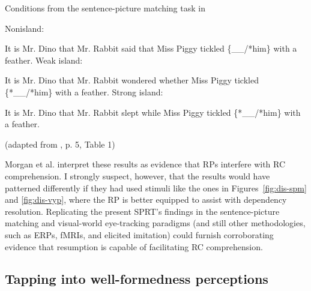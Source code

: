 \pex Conditions from the sentence-picture matching task in \textcite{morgan.etal2020}\par\nobreak
\a Nonisland:\par\nobreak\vspace{5pt}
It is Mr. Dino that Mr. Rabbit said that Miss Piggy tickled \{\_\_/*him\} with a feather.\label{ex-dis-morgan-a}
\a Weak island:\par\nobreak\vspace{5pt}
It is Mr. Dino that Mr. Rabbit wondered whether Miss Piggy tickled \{*\_\_/*him\} with a feather.\label{ex-dis-morgan-b}
\a Strong island:\par\nobreak\vspace{5pt}
It is Mr. Dino that Mr. Rabbit slept while Miss Piggy tickled \{*\_\_/*him\} with a feather.\label{ex-dis-morgan-c}
\par\nobreak\vspace{5pt}
\hfill (adapted from \cite{morgan.etal2020}, p. 5, Table 1)
\xe 

Morgan et al. interpret these results as evidence that RPs interfere with RC comprehension. I strongly suspect, however, that the results would have patterned differently if they had used stimuli like the ones in Figures~\ref{fig:dis-spm} and \ref{fig:dis-vyp}, where the RP is better equipped to assist with dependency resolution. Replicating the present SPRT's findings in the sentence-picture matching and visual-world eye-tracking paradigms (and still other methodologies, such as ERPs, fMRIs, and elicited imitation) could furnish corroborating evidence that resumption is capable of facilitating RC comprehension.

\subsection{Tapping into well-formedness perceptions}\label{dis-limitation-ajt}

